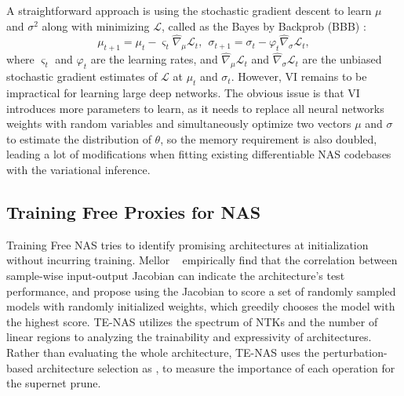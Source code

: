 \documentclass[10pt,twocolumn,letterpaper]{article}
\begin{document}
A straightforward approach is using the stochastic gradient descent to learn $\mu$ and $\sigma ^2$ along with minimizing $\mathcal{L}$, called as the Bayes by Backprob (BBB) \cite{blundell2015weight}:
\begin{equation} \label{eq:BBB}
\mu_{t+1}=\mu_t-\varsigma_t \hat{\nabla}_\mu \mathcal{L}_t, \ \ \sigma_{t+1}=\sigma_t-\varphi_t \hat{\nabla}_\sigma \mathcal{L}_t,
\end{equation}
where $\varsigma_t$ and $\varphi_t$ are the learning rates, and $\hat{\nabla}_\mu\mathcal{L}_t$ and $\hat{\nabla}_\sigma\mathcal{L}_t$ are the unbiased stochastic gradient estimates of $\mathcal{L}$ at $\mu_t$ and $\sigma_t$. However, VI remains to be impractical for learning large deep networks. The obvious issue is that VI introduces more parameters to learn, as it needs to replace all neural networks weights with random variables and simultaneously optimize two vectors $\mu$ and $\sigma$ to estimate the distribution of $\theta$, so the memory requirement is also doubled, leading a lot of modifications when fitting existing differentiable NAS codebases with the variational inference.








\subsection{Training Free Proxies for NAS}
\label{sec2.3}


Training Free NAS tries to identify promising architectures at initialization without incurring training. Mellor \etal~\cite{mellor2020neural} empirically find that the correlation between sample-wise input-output Jacobian can indicate the architecture’s test performance, and propose using the Jacobian to score a set of randomly sampled models with randomly initialized weights, which greedily chooses the model with the highest score. TE-NAS \cite{chen2021neural} utilizes the spectrum of NTKs and the number of linear regions to analyzing the trainability and expressivity of architectures. Rather than evaluating the whole architecture, TE-NAS uses the perturbation-based architecture selection as \cite{Rethinking2021}, to measure the importance of each operation for the supernet prune. 
\end{document}
